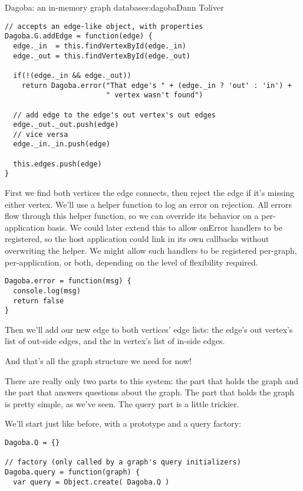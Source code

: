 \begin{aosachapter}{Dagoba: an in-memory graph database}{s:dagoba}{Dann Toliver}
\begin{verbatim}
// accepts an edge-like object, with properties
Dagoba.G.addEdge = function(edge) {                     
  edge._in  = this.findVertexById(edge._in)
  edge._out = this.findVertexById(edge._out)
  
  if(!(edge._in && edge._out)) 
    return Dagoba.error("That edge's " + (edge._in ? 'out' : 'in') + 
                        " vertex wasn't found")

  // add edge to the edge's out vertex's out edges
  edge._out._out.push(edge)                             
  // vice versa
  edge._in._in.push(edge)                               
  
  this.edges.push(edge)
}
\end{verbatim}

First we find both vertices the edge connects, then reject the edge if
it's missing either vertex. We'll use a helper function to log an error
on rejection. All errors flow through this helper function, so we can
override its behavior on a per-application basis. We could later extend
this to allow onError handlers to be registered, so the host application
could link in its own callbacks without overwriting the helper. We might
allow such handlers to be registered per-graph, per-application, or
both, depending on the level of flexibility required.

\begin{verbatim}
Dagoba.error = function(msg) {
  console.log(msg)
  return false 
}
\end{verbatim}

Then we'll add our new edge to both vertices' edge lists: the edge's out
vertex's list of out-side edges, and the in vertex's list of in-side
edges.

And that's all the graph structure we need for now!

\label{enter-the-query}

There are really only two parts to this system: the part that holds the
graph and the part that answers questions about the graph. The part that
holds the graph is pretty simple, as we've seen. The query part is a
little trickier.

We'll start just like before, with a prototype and a query factory:

\begin{verbatim}
Dagoba.Q = {}

// factory (only called by a graph's query initializers)
Dagoba.query = function(graph) {
  var query = Object.create( Dagoba.Q )
  

\end{verbatim}
\end{aosachapter}
